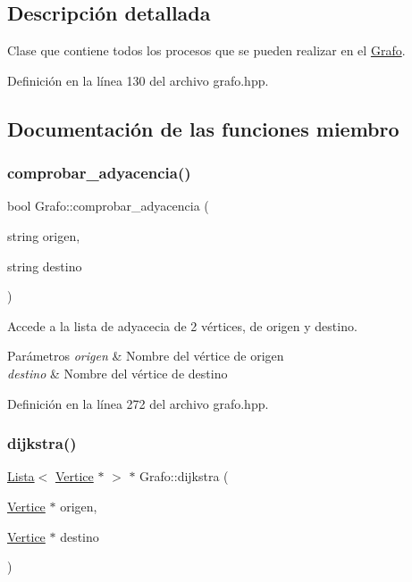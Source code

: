 \subsection{Descripción detallada}
Clase que contiene todos los procesos que se pueden realizar en el \hyperlink{classGrafo}{Grafo}. 

Definición en la línea 130 del archivo grafo.\+hpp.



\subsection{Documentación de las funciones miembro}
\mbox{\label{classGrafo_a7bfb0f93720820e9d0cb8091f32d69a7}} 
\subsubsection{\texorpdfstring{comprobar\+\_\+adyacencia()}{comprobar\_adyacencia()}}
{\footnotesize\ttfamily bool Grafo\+::comprobar\+\_\+adyacencia (\begin{DoxyParamCaption}\item[{string}]{origen,  }\item[{string}]{destino }\end{DoxyParamCaption})}



Accede a la lista de adyacecia de 2 vértices, de \textquotesingle{}origen\textquotesingle{} y \textquotesingle{}destino\textquotesingle{}. 


\begin{DoxyParams}{Parámetros}
{\em origen} & Nombre del vértice de origen \\
\hline
{\em destino} & Nombre del vértice de destino \\
\hline
\end{DoxyParams}


Definición en la línea 272 del archivo grafo.\+hpp.

\mbox{\label{classGrafo_a4bb5d2fe50503dd9f6c8042cee3e3631}} 
\subsubsection{\texorpdfstring{dijkstra()}{dijkstra()}}
{\footnotesize\ttfamily \hyperlink{classLista}{Lista}$<$ \hyperlink{classVertice}{Vertice} $\ast$ $>$ $\ast$ Grafo\+::dijkstra (\begin{DoxyParamCaption}\item[{\hyperlink{classVertice}{Vertice} $\ast$}]{origen,  }\item[{\hyperlink{classVertice}{Vertice} $\ast$}]{destino }\end{DoxyParamCaption})}



